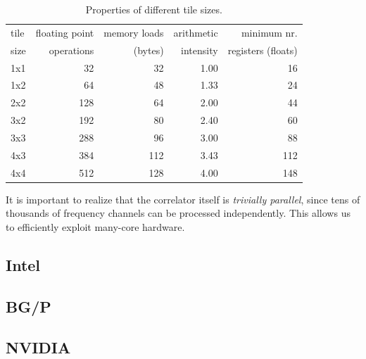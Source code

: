 \documentclass{article}
\begin{document}
\begin{table}
\begin{center}
{\small
\begin{tabular}{l|r|r|r|r}
tile & floating point & memory loads & arithmetic     &  minimum nr.           \\
size & operations     & (bytes)      & intensity      &  registers (floats)    \\
\hline
1x1  &  32            &   32         &   1.00         &  16                    \\
1x2  &  64            &   48         &   1.33         &  24                    \\
2x2  & 128            &   64         &   2.00         &  44                    \\
3x2  & 192            &   80         &   2.40         &  60                    \\
3x3  & 288            &   96         &   3.00         &  88                    \\
4x3  & 384            &  112         &   3.43         & 112                    \\
4x4  & 512            &  128         &   4.00         & 148                    \\
\end{tabular}
} %
\end{center}
\vspace{-0.5cm}
\caption{Properties of different tile sizes.}
\label{tile-size-table}
\end{table}

It is important to realize that the
correlator itself is \emph{trivially parallel}, since tens of thousands of
frequency channels can be processed independently.  This allows us to
efficiently exploit many-core hardware.



\subsection{Intel}
\subsection{BG/P}
\subsection{NVIDIA}
\end{document}
